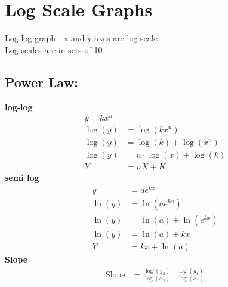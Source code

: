 \documentclass{article}
\begin{document}
\section{Log Scale Graphs}

Log-log graph - x and y axes are log scale \\
Log scales are in sets of 10

\subsection{Power Law:}
\textbf{log-log}
\begin{align*}
	y = kx^n \\
	\log(y) & = \log(kx^n) \\
	\log(y) & = \log(k) + \log(x^n) \\
	\log(y) & = n \cdot \log(x) + \log(k) \\
	Y & = nX + K
\end{align*}
\textbf{semi log}
\begin{align*}
	y & = ae^{kx} \\
	\ln(y) & = \ln(ae^{kx}) \\
	\ln(y) & = \ln(a) + \ln(e^{kx}) \\
	\ln(y) & = \ln(a) + kx \\
	Y & = kx + \ln(a)
\end{align*}
\textbf{Slope}
\begin{align*}
	\text{Slope} & = \frac{\log(y_2) - \log(y_1)}{\log(x_2) - \log(x_1)}
\end{align*}
\end{document}
